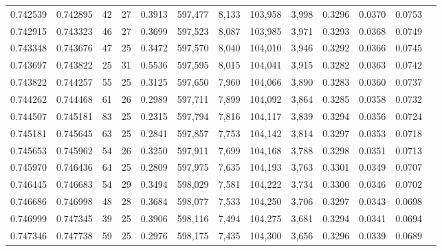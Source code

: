 \begin{tabular}{rrrrrrrrrrrrr}
0.742539 & 0.742895 &  42 &  27 &                                     0.3913 & 597,477 &   8,133 & 103,958 &   3,998 & 0.3296 & 0.0370 & 0.0753 \\
0.742915 & 0.743323 &  46 &  27 &                                     0.3699 & 597,523 &   8,087 & 103,985 &   3,971 & 0.3293 & 0.0368 & 0.0749 \\
0.743348 & 0.743676 &  47 &  25 &                                     0.3472 & 597,570 &   8,040 & 104,010 &   3,946 & 0.3292 & 0.0366 & 0.0745 \\
0.743697 & 0.743822 &  25 &  31 &                                     0.5536 & 597,595 &   8,015 & 104,041 &   3,915 & 0.3282 & 0.0363 & 0.0742 \\
0.743822 & 0.744257 &  55 &  25 &                                     0.3125 & 597,650 &   7,960 & 104,066 &   3,890 & 0.3283 & 0.0360 & 0.0737 \\
0.744262 & 0.744468 &  61 &  26 &                                     0.2989 & 597,711 &   7,899 & 104,092 &   3,864 & 0.3285 & 0.0358 & 0.0732 \\
0.744507 & 0.745181 &  83 &  25 &                                     0.2315 & 597,794 &   7,816 & 104,117 &   3,839 & 0.3294 & 0.0356 & 0.0724 \\
0.745181 & 0.745645 &  63 &  25 &                                     0.2841 & 597,857 &   7,753 & 104,142 &   3,814 & 0.3297 & 0.0353 & 0.0718 \\
0.745653 & 0.745962 &  54 &  26 &                                     0.3250 & 597,911 &   7,699 & 104,168 &   3,788 & 0.3298 & 0.0351 & 0.0713 \\
0.745970 & 0.746436 &  64 &  25 &                                     0.2809 & 597,975 &   7,635 & 104,193 &   3,763 & 0.3301 & 0.0349 & 0.0707 \\
0.746445 & 0.746683 &  54 &  29 &                                     0.3494 & 598,029 &   7,581 & 104,222 &   3,734 & 0.3300 & 0.0346 & 0.0702 \\
0.746686 & 0.746998 &  48 &  28 &                                     0.3684 & 598,077 &   7,533 & 104,250 &   3,706 & 0.3297 & 0.0343 & 0.0698 \\
0.746999 & 0.747345 &  39 &  25 &                                     0.3906 & 598,116 &   7,494 & 104,275 &   3,681 & 0.3294 & 0.0341 & 0.0694 \\
0.747346 & 0.747738 &  59 &  25 &                                     0.2976 & 598,175 &   7,435 & 104,300 &   3,656 & 0.3296 & 0.0339 & 0.0689 \\

\end{tabular}

